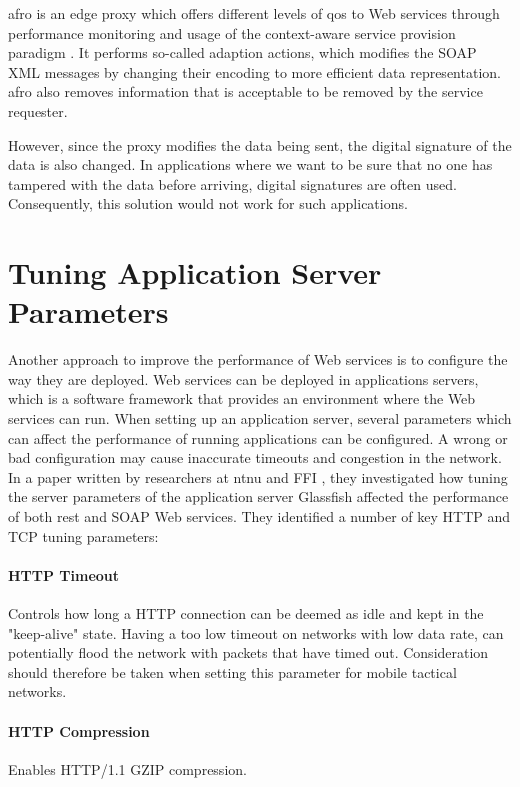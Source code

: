 \gls{afro} is an edge proxy which offers different levels of \gls{qos} to Web
services through performance monitoring and usage of the context-aware service
provision paradigm \cite{ist-090}. It performs so-called adaption actions, which
modifies the SOAP XML messages by changing their encoding to more efficient data
representation. \gls{afro} also removes information that is acceptable to be
removed by the service requester.

However, since the proxy modifies the data being sent, the digital signature of
the data is also changed. In applications where we want to be sure that no one
has tampered with the data before arriving, digital signatures are often used.
Consequently, this solution would not work for such applications.


\section{Tuning Application Server Parameters}

 Another approach to improve the performance of Web services is to configure
 the way they are deployed. Web services can be deployed in applications
 servers, which is a software framework that provides an environment where the
 Web services can run. When setting up an application server, several parameters
 which can affect the performance of running applications can be
 configured. A wrong or bad configuration may cause inaccurate timeouts and
 congestion in the network. In a paper written by researchers at \gls{ntnu} and
 FFI \cite{johnsen-recommendations}, they
 investigated how tuning the server parameters of the application server
 Glassfish affected the performance of both \gls{rest} and SOAP Web services.
 They identified a number of key HTTP and TCP tuning parameters:

\paragraph{HTTP Timeout} Controls how long a HTTP connection can be deemed as
idle and kept in the "keep-alive" state. Having a too low timeout on networks
with low data rate, can potentially flood the network with packets that have
timed out. Consideration should therefore be taken when setting this
parameter for mobile tactical networks.

\paragraph{HTTP Compression} Enables HTTP/1.1 GZIP compression.

